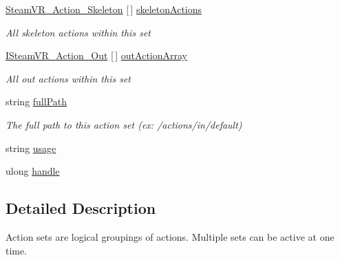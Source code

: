 \begin{DoxyCompactItemize}
\mbox{\hyperlink{class_valve_1_1_v_r_1_1_steam_v_r___action___skeleton}{Steam\+V\+R\+\_\+\+Action\+\_\+\+Skeleton}} \mbox{[}$\,$\mbox{]} \mbox{\hyperlink{class_valve_1_1_v_r_1_1_steam_v_r___action_set___data_a5adc54b82c2104cfd5ff0795c3b068d9}{skeleton\+Actions}}
\begin{DoxyCompactList}\small\item\em All skeleton actions within this set \end{DoxyCompactList}\item 
\mbox{\hyperlink{interface_valve_1_1_v_r_1_1_i_steam_v_r___action___out}{I\+Steam\+V\+R\+\_\+\+Action\+\_\+\+Out}} \mbox{[}$\,$\mbox{]} \mbox{\hyperlink{class_valve_1_1_v_r_1_1_steam_v_r___action_set___data_a907d1af05e4af1621ddf864a3835ac6f}{out\+Action\+Array}}
\begin{DoxyCompactList}\small\item\em All out actions within this set \end{DoxyCompactList}\item 
string \mbox{\hyperlink{class_valve_1_1_v_r_1_1_steam_v_r___action_set___data_a4d57b53a9d1c1e38da8f48928d3ca244}{full\+Path}}
\begin{DoxyCompactList}\small\item\em The full path to this action set (ex\+: /actions/in/default) \end{DoxyCompactList}\item 
string \mbox{\hyperlink{class_valve_1_1_v_r_1_1_steam_v_r___action_set___data_a6baa50a7aac716829461d1513667bbdf}{usage}}
\item 
ulong \mbox{\hyperlink{class_valve_1_1_v_r_1_1_steam_v_r___action_set___data_a14fa7b2b025cf473f20a366ebe96ba5e}{handle}}
\end{DoxyCompactItemize}


\subsection{Detailed Description}
Action sets are logical groupings of actions. Multiple sets can be active at one time. 



